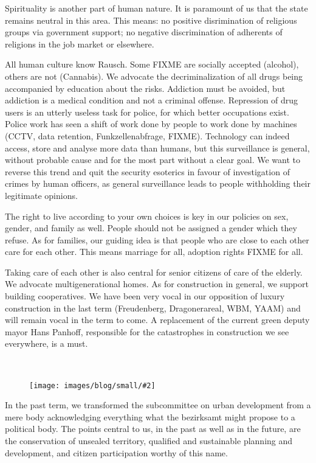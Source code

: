 \documentclass[a4paper,10pt]{article}
\newcommand{\mysection}[1]{{\vspace{1cm}\noindent\color{gray}{\ttfamily\LARGE\raggedright #1}\\\medskip}}
\newcommand{\abschnitt}[2]{%
\mysection{\raggedright #1}%
\begin{figure}[t]%
\vspace*{-2.7cm}%
\hspace*{-2.1cm}%
\texttt{[image: images/blog/small/\#2]} %
\end{figure}%
}
\newcommand{\bottomfigure}[1]{
\parbox{5cm}{
\vspace*{1cm}%
\texttt{[image: ./images/blog/small/\#1]}
}
}
\begin{document}
\enlargethispage{-3em}

Spirituality is another part of human nature. It is paramount of us that the state remains neutral in this area. This means: no positive disrimination of religious groups via government support; no negative discrimination of adherents of religions in the job market or elsewhere.

All human culture know Rausch. Some FIXME are socially accepted (alcohol), others are not (Cannabis). We advocate the decriminalization of all drugs being accompanied by education about the risks. 
Addiction must be avoided, but addiction is a medical condition and not a criminal offense. Repression of drug users is an utterly useless task for police, for which better occupations exist.
Police work has seen a shift of work done by people to work done by machines (CCTV, data retention, Funkzellenabfrage, FIXME). Technology can indeed access, store and analyse more data than humans, but this surveillance is general, without probable cause and for the most part without a clear goal. We want to reverse this trend and quit the security esoterics in favour of investigation of crimes by human officers, as general surveillance leads to people withholding their legitimate opinions.

The right to live according to your own choices is key in our policies on sex, gender, and family as well. People should not be assigned a gender which they refuse. As for families, our guiding idea is that people who are close to each other care for each other. This means marriage for all, adoption rights FIXME for all.

Taking care of each other is also central for senior citizens of care of the elderly. We advocate multigenerational homes. As for construction in general, we support building cooperatives. We have been very vocal in our opposition of luxury construction in the last term (Freudenberg, Dragonerareal, WBM, YAAM) and will remain vocal in the term to come. A replacement of the current green deputy mayor Hans Panhoff, responsible for the catastrophes in construction we see everywhere, is a must.



\clearpage
\abschnitt{Stadtentwicklung}{Betonmischer.png}
In the past term, we transformed the subcommittee on urban development from a mere body acknowledging everything what the bezirksamt might propose to a political body. 
The points central to us, in the past as well as in the future, are the conservation of unsealed territory, qualified and sustainable planning and development, and citizen participation worthy of this name.
\end{document}
